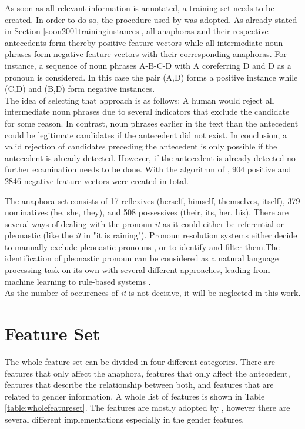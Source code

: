 As soon as all relevant information is annotated, a training set needs to be created. In order to do so, the procedure used by \cite{soon2001machine} was adopted. As already stated in Section \ref{soon2001traininginstances}, all anaphoras and their respective antecedents form thereby positive feature vectors while all intermediate noun phrases form negative feature vectors with their corresponding anaphoras. For instance, a sequence of noun phrases A-B-C-D with A coreferring D and D as a pronoun is considered. In this case the pair (A,D) forms a positive instance while (C,D) and (B,D) form negative instances.\\
The idea of selecting that approach is as follows: A human would reject all intermediate noun phrases due to several indicators that exclude the candidate for some reason. In contrast, noun phrases earlier in the text than the antecedent could be legitimate candidates if the antecedent did not exist. In conclusion, a valid rejection of candidates preceding the antecedent is only possible if the antecedent is already detected. However, if the antecedent is already detected no further examination needs to be done. With the algorithm of \cite{soon2001machine}, 904 positive and 2846 negative feature vectors were created in total.

The anaphora set consists of 17 reflexives (herself, himself, themselves, itself), 379 nominatives (he, she, they), and 508 possessives (their, its, her, his). There are several ways of dealing with the pronoun \textit{it} as it could either be referential or pleonastic (like the \textit{it} in "it is raining"). Pronoun resolution systems either decide to manually exclude pleonastic pronouns \citep{kennedy1996anaphora,bergsma2005automatic}, or to identify and filter them.The identification of pleonastic pronoun can be considered as a natural language processing task on its own with several different approaches, leading from machine learning \citep{boyd2005identifying} to rule-based systems \citep{lappin1994algorithm}.\\
As the number of occurences of \textit{it} is not decisive, it will be neglected in this work.


\section{Feature Set}
The whole feature set can be divided in four different categories. There are features that only affect the anaphora, features that only affect the antecedent, features that describe the relationship between both, and features that are related to gender information. A whole list of features is shown in Table \ref{table:wholefeatureset}. The features are mostly adopted by \cite{bergsma2005automatic}, however there are several different implementations especially in the gender features.

